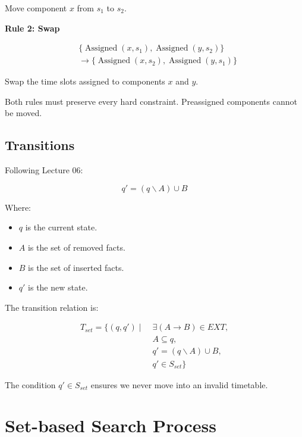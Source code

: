 \documentclass[11pt,letterpaper]{article}
\newcommand{\setminusop}{\mathbin{\backslash}}
\newcommand{\Assign}{\operatorname{Assigned}}
\newcommand{\EXT}{\mathit{EXT}}
\begin{document}
Move component $x$ from $s_1$ to $s_2$.

\textbf{Rule 2: Swap}

\begin{equation}
\boxed{
\begin{aligned}
&
\{\Assign(x,s_1),\Assign(y,s_2)\}\\
&\longrightarrow
\{\Assign(x,s_2),\Assign(y,s_1)\}
\end{aligned}
}
\end{equation}

Swap the time slots assigned to components
$x$ and $y$.

Both rules must preserve every hard constraint.
Preassigned components cannot be moved.

\subsection{Transitions}

Following Lecture 06:

\begin{equation}
\boxed{
q'=(q\setminusop A)\cup B
}
\end{equation}

Where:

\begin{itemize}
    \item $q$ is the current state.
    \item $A$ is the set of removed facts.
    \item $B$ is the set of inserted facts.
    \item $q'$ is the new state.
\end{itemize}

The transition relation is:

\begin{equation}
\boxed{
\begin{aligned}
T_{set}=\{(q,q')\mid\;&
\exists(A\rightarrow B)\in\EXT,\\
&A\subseteq q,\\
&q'=(q\setminusop A)\cup B,\\
&q'\in S_{set}
\}
\end{aligned}
}
\end{equation}

The condition $q'\in S_{set}$ ensures
we never move into an invalid timetable.

\section{Set-based Search Process}
\end{document}
